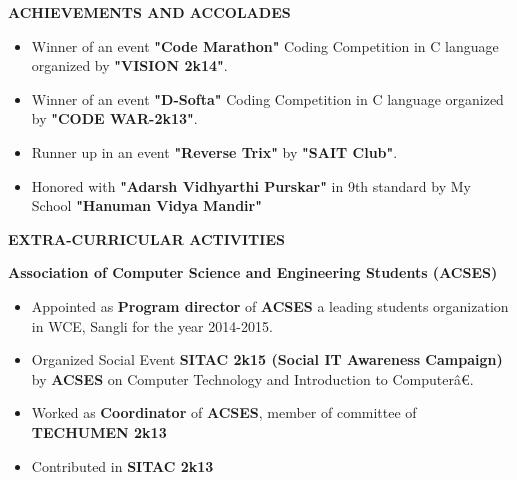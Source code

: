 \documentclass{article}
\begin{document}
\begin{minipage}{\textwidth}
	\begin{framed}
		\large{\textbf{ACHIEVEMENTS AND ACCOLADES}}
	\end{framed} 
	\begin{comment}
	\large{\textbf{\setlength{\parindent}{15pt}
			\indent Coding Competitions}}\\
	\end{comment}
	\begin{itemize}
		\item Winner of an event \textbf{"Code Marathon"} Coding Competition in C language organized by \textbf{"VISION 2k14"}.
		\item Winner of an event \textbf{"D-Softa"} Coding Competition in C language organized by \textbf{"CODE WAR-2k13"}.
		\item Runner up in an event \textbf{"Reverse Trix"}  by \textbf{ "SAIT Club"}.
		\item Honored with \textbf{"Adarsh Vidhyarthi Purskar"} in 9th standard by My School \textbf{"Hanuman Vidya Mandir"}
	\end{itemize}
\end{minipage}




\vspace{1cm}

\begin{minipage}{\textwidth}
	
\begin{framed}
	\large{\textbf{EXTRA-CURRICULAR ACTIVITIES}}
\end{framed}

\textbf{\setlength{\parindent}{20pt}\indent Association of Computer Science and Engineering Students (ACSES)}
\begin{itemize}
	\itemsep1pt \parskip0pt 
	\setlength{\itemsep}{0.1cm}%
	\setlength{\parskip}{0.2cm}%
	\setlength{\parsep}{0.2cm}%
	\item Appointed as \textbf{Program director} of \textbf{ACSES} a leading students organization in WCE, Sangli for the year 2014-2015.
	\item Organized Social Event \textbf{SITAC 2k15 (Social IT Awareness Campaign)} by \textbf{ACSES} on Computer Technology and Introduction to Computerâ€.
	\item Worked as \textbf{Coordinator} of \textbf{ACSES}, member of committee of \textbf{TECHUMEN 2k13}
	\item Contributed in \textbf{SITAC 2k13}
	
\end{itemize}

\end{minipage}
\end{document}
